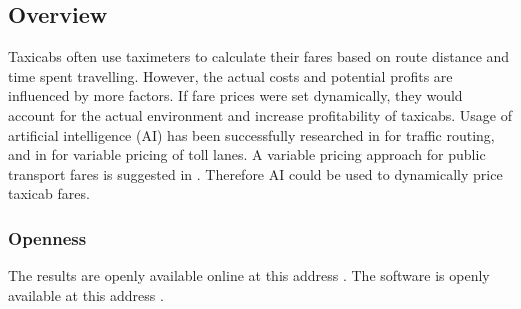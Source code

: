 \subsection{Overview}


Taxicabs often use taximeters to calculate their fares based on route distance
and time spent travelling. However, the actual costs and potential profits are
influenced by more factors. If fare prices were set dynamically, they would
account for the actual environment and increase profitability of taxicabs.
Usage of artificial intelligence (AI) has been successfully researched in
\textcite{Tavares2012ai+routing} for traffic routing, and in
\textcite{Lou2011ai+highways} for variable pricing of toll lanes. A variable
pricing approach for public transport fares is suggested in
\textcite{Emele2013pricing+rural}. Therefore AI could be used to dynamically
price taxicab fares.

\subsubsection{Openness}
\label{sec:intro:openness}

The results are openly available online at this address .
The software is openly available at this address .
